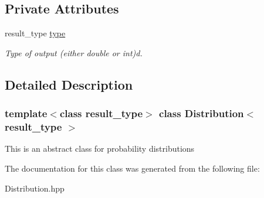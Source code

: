 \subsection*{Private Attributes}
\begin{DoxyCompactItemize}
\item 
\mbox{\label{class_distribution_a03f9b45f166879c67144cee48179c397}} 
result\+\_\+type \hyperlink{class_distribution_a03f9b45f166879c67144cee48179c397}{type}
\begin{DoxyCompactList}\small\item\em Type of output (either double or int)d. \end{DoxyCompactList}\end{DoxyCompactItemize}


\subsection{Detailed Description}
\subsubsection*{template$<$class result\+\_\+type$>$\newline
class Distribution$<$ result\+\_\+type $>$}

This is an abstract class for probability distributions 

The documentation for this class was generated from the following file\+:\begin{DoxyCompactItemize}
\item 
Distribution.\+hpp\end{DoxyCompactItemize}
